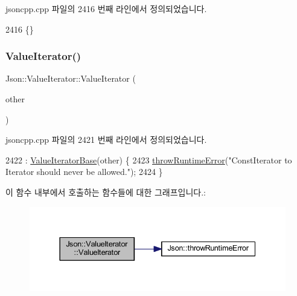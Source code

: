 jsoncpp.\+cpp 파일의 2416 번째 라인에서 정의되었습니다.


\begin{DoxyCode}
2416 \{\}
\end{DoxyCode}
\mbox{\label{class_json_1_1_value_iterator_aa85aa208670891670392259efa0143bb}} 
\subsubsection{\texorpdfstring{Value\+Iterator()}{ValueIterator()}\hspace{0.1cm}{\footnotesize\ttfamily [2/4]}}
{\footnotesize\ttfamily Json\+::\+Value\+Iterator\+::\+Value\+Iterator (\begin{DoxyParamCaption}\item[{const \hyperlink{class_json_1_1_value_const_iterator}{Value\+Const\+Iterator} \&}]{other }\end{DoxyParamCaption})\hspace{0.3cm}{\ttfamily [explicit]}}



jsoncpp.\+cpp 파일의 2421 번째 라인에서 정의되었습니다.


\begin{DoxyCode}
2422     : \hyperlink{class_json_1_1_value_iterator_base_af45b028d9ff9cbd2554a87878b42dd75}{ValueIteratorBase}(other) \{
2423   \hyperlink{namespace_json_a0ab7ff7f99788262d92d9ff3d924e065}{throwRuntimeError}(\textcolor{stringliteral}{"ConstIterator to Iterator should never be allowed."});
2424 \}
\end{DoxyCode}
이 함수 내부에서 호출하는 함수들에 대한 그래프입니다.\+:\nopagebreak
\begin{figure}[H]
\begin{center}
\leavevmode
\includegraphics[width=337pt]{class_json_1_1_value_iterator_aa85aa208670891670392259efa0143bb_cgraph}
\end{center}
\end{figure}
\mbox{\label{class_json_1_1_value_iterator_a7d5e58a9a4a553968acdf3064b39d21c}} 
